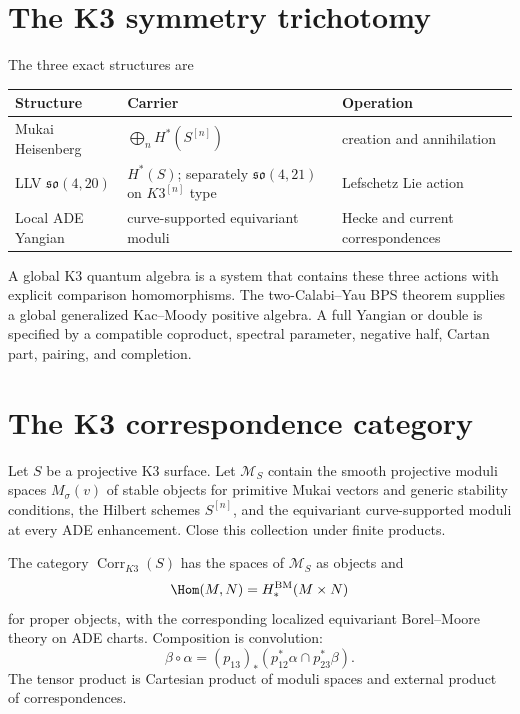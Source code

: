 \chapter{The K3 symmetry trichotomy}
The three exact structures are
\begin{center}
\small
\begin{tabularx}{0.96\textwidth}{@{}>{\raggedright\arraybackslash}p{}>{\raggedright\arraybackslash}X>{\raggedright\arraybackslash}p{}@{}}
\toprule
\textbf{Structure}&\textbf{Carrier}&\textbf{Operation}\\
\midrule
Mukai Heisenberg&$\bigoplus_nH^*(S^{[n]})$&creation and annihilation\\
LLV $\mathfrak{so}(4,20)$&$H^*(S)$; separately $\mathfrak{so}(4,21)$ on $K3^{[n]}$ type&Lefschetz Lie action\\
Local ADE Yangian&curve-supported equivariant moduli&Hecke and current correspondences\\
\bottomrule
\end{tabularx}
\end{center}
A global K3 quantum algebra is a system that contains these three actions with explicit comparison homomorphisms. The two-Calabi--Yau BPS theorem supplies a global generalized Kac--Moody positive algebra. A full Yangian or double is specified by a compatible coproduct, spectral parameter, negative half, Cartan part, pairing, and completion.

\chapter{The K3 correspondence category}
Let $S$ be a projective K3 surface.  Let $\mathscr M_S$ contain the smooth projective moduli spaces $M_\sigma(v)$ of stable objects for primitive Mukai vectors and generic stability conditions, the Hilbert schemes $S^{[n]}$, and the equivariant curve-supported moduli at every ADE enhancement.  Close this collection under finite products.

\begin{definition}
The category $\operatorname{Corr}_{K3}(S)$ has the spaces of $\mathscr M_S$ as objects and
\[
 \Hom(M,N)=H^{\mathrm{BM}}_*(M\times N)
\]
for proper objects, with the corresponding localized equivariant Borel--Moore theory on ADE charts.  Composition is convolution:
\[
 \beta\circ\alpha
 =(p_{13})_*
 \left(p_{12}^*\alpha\cap p_{23}^*\beta\right).
\]
The tensor product is Cartesian product of moduli spaces and external product of correspondences.
\end{definition}

